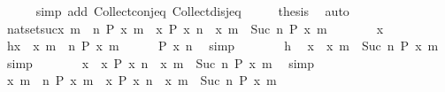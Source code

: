 \begin{isabellebody}
\ \ \ \ \isamarkupfalse%
\ {\isacharparenleft}simp\ add{\isacharcolon}\ Collect{\isacharunderscore}conj{\isacharunderscore}eq\ Collect{\isacharunderscore}disj{\isacharunderscore}eq{\isacharparenright}\isanewline
\ \ \isamarkupfalse%
\ \isamarkupfalse%
\ {\isacharquery}thesis\ \isamarkupfalse%
\ auto\isanewline
{}\isamarkupfalse%
%
\endisatagproof
{\isafoldproof}%
%
\isadelimproof
\isanewline
%
\endisadelimproof
\isanewline
{}\isamarkupfalse%
\ nat{\isacharunderscore}set{\isacharunderscore}suc{\isacharcolon}{\isacartoucheopen}{\isacharbraceleft}x{\isachardot}\ {\isasymforall}m\ {\isasymge}\ n{\isachardot}\ P\ x\ m{\isacharbraceright}\ {\isacharequal}\ {\isacharbraceleft}x{\isachardot}\ P\ x\ n{\isacharbraceright}\ {\isasyminter}\ {\isacharbraceleft}x{\isachardot}\ {\isasymforall}m\ {\isasymge}\ Suc\ n{\isachardot}\ P\ x\ m{\isacharbraceright}{\isacartoucheclose}\isanewline
%
\isadelimproof
%
\endisadelimproof
%
\isatagproof
{}\isamarkupfalse%
\isanewline
\ \ \ \ \isacommand{{\isacharbraceleft}}\isamarkupfalse%
\ \isamarkupfalse%
\ x\ \isamarkupfalse%
\ h{\isacharcolon}{\isacartoucheopen}x\ {\isasymin}\ {\isacharbraceleft}x{\isachardot}\ {\isasymforall}m\ {\isasymge}\ n{\isachardot}\ P\ x\ m{\isacharbraceright}{\isacartoucheclose}\isanewline
\ \ \ \ \isamarkupfalse%
\ {\isacartoucheopen}P\ x\ n{\isacartoucheclose}\ \isamarkupfalse%
\ simp\isanewline
\ \ \ \ \isamarkupfalse%
\ \isamarkupfalse%
\ h\ \isamarkupfalse%
\ {\isacartoucheopen}x\ {\isasymin}\ {\isacharbraceleft}x{\isachardot}\ {\isasymforall}m\ {\isasymge}\ Suc\ n{\isachardot}\ P\ x\ m{\isacharbraceright}{\isacartoucheclose}\ \isamarkupfalse%
\ simp\isanewline
\ \ \ \ \isamarkupfalse%
\ \isamarkupfalse%
\ {\isacartoucheopen}x\ {\isasymin}\ {\isacharbraceleft}x{\isachardot}\ P\ x\ n{\isacharbraceright}\ {\isasyminter}\ {\isacharbraceleft}x{\isachardot}\ {\isasymforall}m\ {\isasymge}\ Suc\ n{\isachardot}\ P\ x\ m{\isacharbraceright}{\isacartoucheclose}\ \isamarkupfalse%
\ simp\isanewline
\ \ \isacommand{{\isacharbraceright}}\isamarkupfalse%
\ \isamarkupfalse%
\ {\isacartoucheopen}{\isacharbraceleft}x{\isachardot}\ {\isasymforall}m\ {\isasymge}\ n{\isachardot}\ P\ x\ m{\isacharbraceright}\ {\isasymsubseteq}\ {\isacharbraceleft}x{\isachardot}\ P\ x\ n{\isacharbraceright}\ {\isasyminter}\ {\isacharbraceleft}x{\isachardot}\ {\isasymforall}m\ {\isasymge}\ Suc\ n{\isachardot}\ P\ x\ m{\isacharbraceright}{\isacartoucheclose}\ \isacommand{{\isachardot}{\isachardot}}\isamarkupfalse%

\end{isabellebody}
